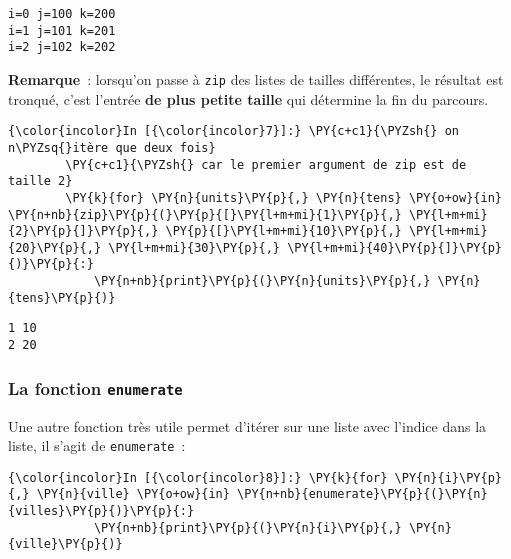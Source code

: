     \begin{Verbatim}[commandchars=\\\{\},frame=single,framerule=0.3mm,rulecolor=\color{cellframecolor}]
i=0 j=100 k=200
i=1 j=101 k=201
i=2 j=102 k=202
\end{Verbatim}

    \textbf{Remarque}~: lorsqu'on passe à \texttt{zip} des listes de tailles
différentes, le résultat est tronqué, c'est l'entrée \textbf{de plus
petite taille} qui détermine la fin du parcours.

    \begin{Verbatim}[commandchars=\\\{\},frame=single,framerule=0.3mm,rulecolor=\color{cellframecolor}]
{\color{incolor}In [{\color{incolor}7}]:} \PY{c+c1}{\PYZsh{} on n\PYZsq{}itère que deux fois}
        \PY{c+c1}{\PYZsh{} car le premier argument de zip est de taille 2}
        \PY{k}{for} \PY{n}{units}\PY{p}{,} \PY{n}{tens} \PY{o+ow}{in} \PY{n+nb}{zip}\PY{p}{(}\PY{p}{[}\PY{l+m+mi}{1}\PY{p}{,} \PY{l+m+mi}{2}\PY{p}{]}\PY{p}{,} \PY{p}{[}\PY{l+m+mi}{10}\PY{p}{,} \PY{l+m+mi}{20}\PY{p}{,} \PY{l+m+mi}{30}\PY{p}{,} \PY{l+m+mi}{40}\PY{p}{]}\PY{p}{)}\PY{p}{:}
            \PY{n+nb}{print}\PY{p}{(}\PY{n}{units}\PY{p}{,} \PY{n}{tens}\PY{p}{)}
\end{Verbatim}


    \begin{Verbatim}[commandchars=\\\{\},frame=single,framerule=0.3mm,rulecolor=\color{cellframecolor}]
1 10
2 20
\end{Verbatim}

    \hypertarget{la-fonction-enumerate}{%
\subsubsection{\texorpdfstring{La fonction
\texttt{enumerate}}{La fonction enumerate}}\label{la-fonction-enumerate}}

    Une autre fonction très utile permet d'itérer sur une liste avec
l'indice dans la liste, il s'agit de \texttt{enumerate}~:

    \begin{Verbatim}[commandchars=\\\{\},frame=single,framerule=0.3mm,rulecolor=\color{cellframecolor}]
{\color{incolor}In [{\color{incolor}8}]:} \PY{k}{for} \PY{n}{i}\PY{p}{,} \PY{n}{ville} \PY{o+ow}{in} \PY{n+nb}{enumerate}\PY{p}{(}\PY{n}{villes}\PY{p}{)}\PY{p}{:}
            \PY{n+nb}{print}\PY{p}{(}\PY{n}{i}\PY{p}{,} \PY{n}{ville}\PY{p}{)}
\end{Verbatim}


